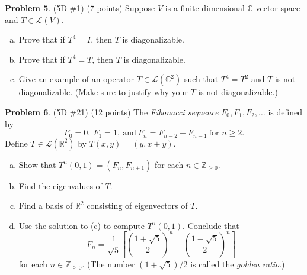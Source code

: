\documentclass[reqno, 12pt]{amsart}
\theoremstyle{definition}
\newenvironment{problab}[1]
{\noindent\textbf{Problem #1}.}
{\vskip 6pt}
\theoremstyle{remark}
\newcommand{\C}{\mathbb C}
\newcommand{\R}{\mathbb R}
\newcommand{\Z}{\mathbb Z}
\renewcommand{\L}{\mathcal L}
\begin{document}
\begin{problab}{5} (5D \#1) (7 points)
  Suppose $V$ is a finite-dimensional $\C$-vector space and $T \in \L(V)$.
  \begin{enumerate}[(a)]
    \item 
      Prove that if $T^4 = I$, then $T$ is diagonalizable.
    \item
      Prove that if $T^4 = T$, then $T$ is diagonalizable.
    \item
      Give an example of an operator $T \in \L(\C^2)$ such that $T^4 = T^2$ and $T$ is not diagonalizable. (Make sure to justify why your $T$ is not diagonalizable.)
  \end{enumerate}
\end{problab}

\begin{problab}{6} (5D \#21) (12 points)
  The \textit{Fibonacci sequence} $F_0, F_1, F_2, \ldots$ is defined by
  \begin{equation*}
    F_0 = 0, \ F_1 = 1, \ \text{and} \ F_n = F_{n-2} + F_{n-1} \ \text{for $n \geq 2$.}
  \end{equation*}
    Define $T \in \L(\R^2)$ by $T(x,y) = (y, x+y)$.
    \begin{enumerate}[(a)]
      \item 
        Show that $T^n(0,1) = (F_n, F_{n+1})$ for each $n \in \Z_{\geq 0}$.
      \item
        Find the eigenvalues of $T$.
      \item
        Find a basis of $\R^2$ consisting of eigenvectors of $T$.
      \item
        Use the solution to (c) to compute $T^n(0,1)$. Conclude that
        \begin{equation*}
          F_n = \frac{1}{\sqrt{5}} \left[ \left( \frac{1+\sqrt{5}}{2} \right)^n - \left( \frac{1 - \sqrt{5}}{2} \right)^n \right]
        \end{equation*}
        for each $n \in \Z_{\geq 0}$. (The number $(1+\sqrt{5})/2$ is called the \textit{golden ratio}.)
    \end{enumerate}
\end{problab}
\end{document}

